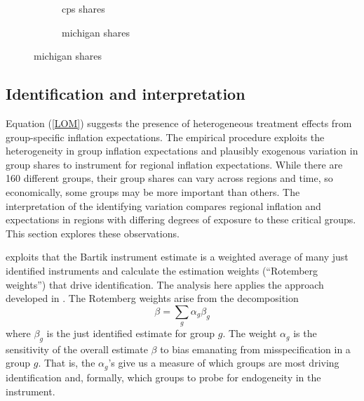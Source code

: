 \documentclass[12pt]{article}
\begin{document}
\begin{figure}
\centering
\caption{Impulse responses}\label{fig:base:irf}
\begin{subfigure}[t]{0.475\textwidth}
\centering

\caption{cps shares}
\end{subfigure}
\quad
\begin{subfigure}[t]{0.475\textwidth}
\centering

\caption{michigan shares}
\end{subfigure}
\end{figure}

\subsection{Identification and interpretation}

Equation (\ref{LOM}) suggests the presence of heterogeneous treatment effects from group-specific inflation expectations. The empirical procedure exploits the heterogeneity in group inflation expectations and plausibly exogenous variation in group shares to instrument for regional inflation expectations. While there are 160 different groups, their group shares can vary across regions and time, so economically, some groups may be more important than others. The interpretation of the identifying variation compares regional inflation and expectations in regions with differing degrees of exposure to these critical groups. This section explores these observations.

\cite{Pinkhametal:AER2020} exploits that the Bartik instrument estimate is a weighted average of many just identified instruments and calculate the estimation weights (``Rotemberg weights'') that drive identification. The analysis here applies the approach developed in \cite{Pinkhametal:AER2020}. The Rotemberg weights arise from the decomposition
$$ \beta = \sum_g \alpha_g\beta_g$$
where $\beta_g$ is the just identified estimate for group $g$. The weight $\alpha_g$ is the sensitivity of the overall estimate $\beta$ to bias emanating from misspecification in a group $g$. That is, the $\alpha_g$'s give us a measure of which groups are most driving identification and, formally, which groups to probe for endogeneity in the instrument.  



\end{document}
